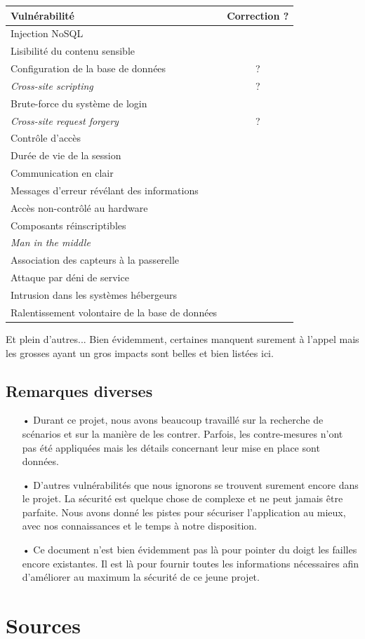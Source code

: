 \documentclass[12pt]{article}
\newcommand{\cmark}{\textcolor{pgreen}{\ding{51}}}%
\newcommand{\xmark}{\textcolor{pred}{\ding{55}}}%
\begin{document}
\renewcommand{\arraystretch}{1.5}
\begin{tabular}{|p{9cm}|c|}
\hline
\textbf{Vulnérabilité} & \textbf{Correction ?} \\
\hline
Injection NoSQL & \cmark \\
\hline
Lisibilité du contenu sensible & \cmark \\
\hline
Configuration de la base de données & ? \\
\hline
\emph{Cross-site scripting} & ? \\
\hline
Brute-force du système de login & \xmark \\
\hline
\emph{Cross-site request forgery} & ? \\
\hline
Contrôle d'accès & \cmark \\
\hline
Durée de vie de la session & \cmark \\
\hline
Communication en clair & \cmark \\
\hline
Messages d'erreur révélant des informations & \cmark \\
\hline
Accès non-contrôlé au hardware & \xmark \\
\hline
Composants réinscriptibles & \xmark \\
\hline
\emph{Man in the middle} & \cmark \\
\hline
Association des capteurs à la passerelle & \cmark \\
\hline
Attaque par déni de service & \xmark \\
\hline
Intrusion dans les systèmes hébergeurs & \cmark \\
\hline
Ralentissement volontaire de la base de données & \cmark \\
\hline
\end{tabular}
\renewcommand{\arraystretch}{1}
\vspace{5mm}

Et plein d'autres... Bien évidemment, certaines manquent surement à l'appel mais les grosses ayant un gros impacts sont belles et bien listées ici. 

\clearpage
\subsection*{Remarques diverses}

\begin{itemize}
\item[•] Durant ce projet, nous avons beaucoup travaillé sur la recherche de scénarios et sur la manière de les contrer. Parfois, les contre-mesures n'ont pas été appliquées mais les détails concernant leur mise en place sont données.
\item[•] D'autres vulnérabilités que nous ignorons se trouvent surement encore dans le projet. La sécurité est quelque chose de complexe et ne peut jamais être parfaite. Nous avons donné les pistes pour sécuriser l'application au mieux, avec nos connaissances et le temps à notre disposition.
\item[•] Ce document n'est bien évidemment pas là pour pointer du doigt les failles encore existantes. Il est là pour fournir toutes les informations nécessaires afin d'améliorer au maximum la sécurité de ce jeune projet. 
\end{itemize}


\section{Sources}
\label{sec:sources}
\end{document}
